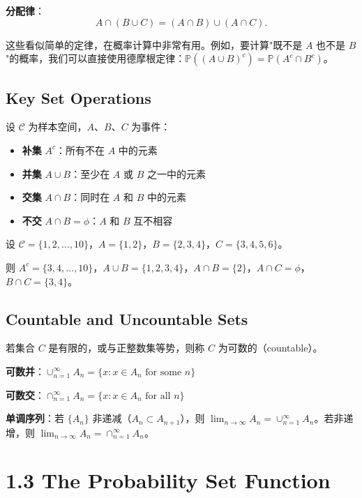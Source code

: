 \textbf{分配律}：
\[
A \cap (B \cup C) = (A \cap B) \cup (A \cap C).
\label{eq:distributive-law}
\]

这些看似简单的定律，在概率计算中非常有用。例如，要计算"既不是 $A$ 也不是 $B$"的概率，我们可以直接使用德摩根定律：$\mathbb{P}((A \cup B)^c) = \mathbb{P}(A^c \cap B^c)$。

\subsection{Key Set Operations}

设 $\mathcal{C}$ 为样本空间，$A$、$B$、$C$ 为事件：

\begin{itemize}
    \item \textbf{补集} $A^c$：所有不在 $A$ 中的元素
    \item \textbf{并集} $A \cup B$：至少在 $A$ 或 $B$ 之一中的元素
    \item \textbf{交集} $A \cap B$：同时在 $A$ 和 $B$ 中的元素
    \item \textbf{不交} $A \cap B = \phi$：$A$ 和 $B$ 互不相容
\end{itemize}

\begin{example}\label{ex:set-ops-ch1}
设 $\mathcal{C} = \{1, 2, \ldots, 10\}$，$A = \{1, 2\}$，$B = \{2, 3, 4\}$，$C = \{3, 4, 5, 6\}$。

则 $A^c = \{3,4,\ldots,10\}$，$A \cup B = \{1,2,3,4\}$，$A \cap B = \{2\}$，$A \cap C = \phi$，$B \cap C = \{3,4\}$。
\end{example}

\subsection{Countable and Uncountable Sets}

若集合 $C$ 是有限的，或与正整数集等势，则称 $C$ 为可数的（countable）。

\textbf{可数并}：$\cup_{n=1}^{\infty} A_n = \{x: x \in A_n \text{ for some } n\}$

\textbf{可数交}：$\cap_{n=1}^{\infty} A_n = \{x: x \in A_n \text{ for all } n\}$

\textbf{单调序列}：若 $\{A_n\}$ 非递减（$A_n \subset A_{n+1}$），则 $\lim_{n\to\infty} A_n = \cup_{n=1}^{\infty} A_n$。若非递增，则 $\lim_{n\to\infty} A_n = \cap_{n=1}^{\infty} A_n$。

\section{1.3 The Probability Set Function}\label{sec:1.3}

